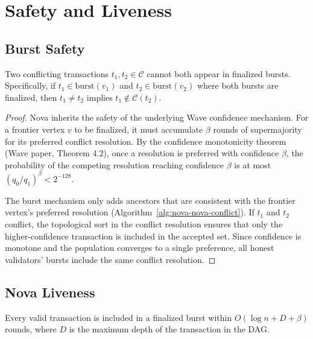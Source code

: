 \section{Safety and Liveness}

\label{sec:nova-safety}

\subsection{Burst Safety}

\begin{theorem}
\label{thm:nova-nova-safety}
Two conflicting transactions $t_1, t_2 \in \mathcal{C}$ cannot both appear in
finalized bursts. Specifically, if $t_1 \in \text{burst}(v_1)$ and
$t_2 \in \text{burst}(v_2)$ where both bursts are finalized, then $t_1 \neq t_2$
implies $t_1 \notin \mathcal{C}(t_2)$.
\end{theorem}

\begin{proof}
Nova inherits the safety of the underlying Wave confidence mechanism. For a frontier
vertex $v$ to be finalized, it must accumulate $\beta$ rounds of supermajority for
its preferred conflict resolution. By the confidence monotonicity theorem (Wave paper,
Theorem 4.2), once a resolution is preferred with confidence $\beta$, the probability
of the competing resolution reaching confidence $\beta$ is at most $(q_0/q_1)^\beta < 2^{-128}$.

The burst mechanism only adds ancestors that are consistent with the frontier vertex's
preferred resolution (Algorithm~\ref{alg:nova-nova-conflict}). If $t_1$ and $t_2$ conflict,
the topological sort in the conflict resolution ensures that only the higher-confidence
transaction is included in the accepted set. Since confidence is monotone and the
population converges to a single preference, all honest validators' bursts include
the same conflict resolution.
\end{proof}

\subsection{Nova Liveness}

\begin{lemma}
\label{lem:nova-nova-liveness}
Every valid transaction is included in a finalized burst within $O(\log n + D + \beta)$
rounds, where $D$ is the maximum depth of the transaction in the DAG.
\end{lemma}

